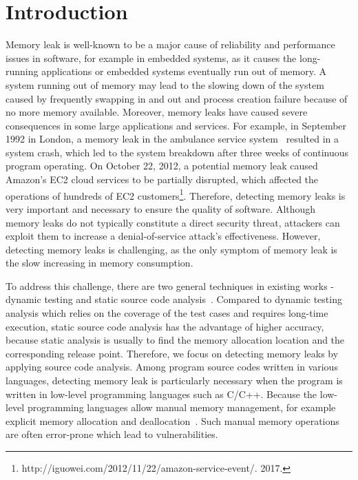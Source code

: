 \section{Introduction}\label{sec:intro}
Memory leak is well-known to be a major cause of reliability and performance issues in software, for example in embedded systems, as it causes the long-running applications or embedded systems eventually run out of memory. 
A system running out of memory may lead to the slowing down of the system caused by frequently swapping in and out and process creation failure because of no more memory available. Moreover, memory leaks have caused severe consequences in some large applications and services. For example, in September 1992 in London, a memory leak in the ambulance service system~\cite{F93} resulted in a system crash, which led to the system breakdown after three weeks of continuous program operating. On October 22, 2012, a potential memory leak caused Amazon's EC2 cloud services to be partially disrupted, which affected the operations of hundreds of EC2 customers\footnote{http://iguowei.com/2012/11/22/amazon-service-event/. 2017.}. 
Therefore, detecting memory leaks is very important and necessary to ensure the quality of software. Although memory leaks do not typically constitute a direct security threat, attackers can exploit them to increase a denial-of-service attack’s effectiveness.
However, detecting memory leaks is challenging, as the only symptom of memory leak is the slow increasing in memory consumption.  

To address this challenge, there are two general techniques in existing works - dynamic testing and static source code analysis~\cite{AJ06}. 
Compared to dynamic testing analysis which relies on the coverage of the test cases and requires long-time execution, static source code analysis has the advantage of higher accuracy, because static analysis is usually to find the memory allocation location and the corresponding release point.
Therefore, we focus on detecting memory leaks by applying source code analysis.
Among program source codes written in various languages, detecting memory leak is particularly necessary when the program is written in low-level programming languages such as C/C++. Because the low-level programming languages allow manual memory management, for example explicit memory allocation and deallocation~\cite{KJMP06}. Such manual memory operations are often error-prone which lead to vulnerabilities. 

